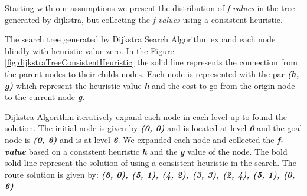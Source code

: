 \documentclass[11pt,a4paper,oneside]{report}
\begin{document}
Starting with our assumptions we present the distribution of \textit{f-values} in the tree generated by dijkstra, but collecting the \textit{f-values} using a consistent heuristic.

The search tree generated by Dijkstra Search Algorithm expand each node blindly with heuristic value zero. In the Figure \ref{fig:dijkstraTreeConsistentHeuristic} the solid line represents the connection from the parent nodes to their childs nodes. Each node is represented with the par \textbf{\textit{(h, g)}} which represent the heuristic value \textbf{\textit{h}} and the cost to go from the origin node to the current node \textbf{\textit{g}}.\newline 

Dijkstra Algorithm iteratively expand each node in each level up to found the solution. The initial node is given by \textbf{\textit{(0, 0)}} and is located at level \textbf{\textit{0}} and the goal node is \textbf{\textit{(0, 6)}} and is at level \textbf{\textit{6}}. We expanded each node and collected the \textbf{\textit{f-value}} based on a consistent heuristic \textbf{\textit{h}} and the \textbf{\textit{g}} value of the node. The bold solid line represent the solution of using a consistent heuristic in the search. The route solution is given by: \textbf{\textit{(6, 0), (5, 1), (4, 2), (3, 3), (2, 4), (5, 1), (0, 6)}}\newline
\end{document}
